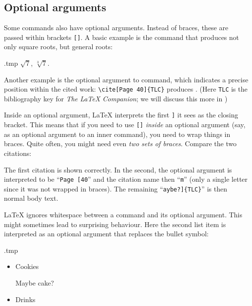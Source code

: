 %
\subsection{Optional arguments}

Some commands also have optional arguments.
Instead of braces, these are passed within brackets \verb|[]|.
A basic example is the  command
that produces not only square roots, but general roots:
\begin{VerbatimOut}{\jobname.tmp}
$\sqrt{7}$,
$\sqrt[3]{7}$.
\end{VerbatimOut}
\ShowExample

Another example is the optional argument to  command,
which indicates a precise position within the cited work:
\verb|\cite[Page 40]{TLC}| produces \cite[Page 40]{TLC}.
(Here \verb|TLC| is the bibliography key for \emph{The \LaTeX{} Companion};
we will discuss this more in )

\begin{gotcha}
Inside an optional argument, \LaTeX{} interprets the first \verb|]| it sees as the closing bracket.
This means that if you need to use \verb|[]| \emph{inside} an optional argument
(say, as an optional argument to an inner command), you need to wrap things in braces.
Quite often, you might need even \emph{two sets of braces}.
Compare the two citations:
%
\ShowExample
%
The first citation is shown correctly.
In the second, the optional argument is interpreted to be ``\verb|Page [40|''
and the citation name then ``\verb|m|'' (only a single letter since it was not wrapped in braces).
The remaining ``\verb|aybe?]{TLC}|'' is then normal body text.
\end{gotcha}

\begin{gotcha}
\LaTeX{} ignores whitespace between a command and its optional argument.
This might sometimes lead to surprising behaviour.
Here the second list item is interpreted as an optional argument that replaces the bullet symbol:
%
\begin{VerbatimOut}{\jobname.tmp}
\begin{itemize}
\item Cookies
\item [Maybe cake?]
\item Drinks
\end{itemize}
\end{VerbatimOut}
\ShowExample
\end{gotcha}



